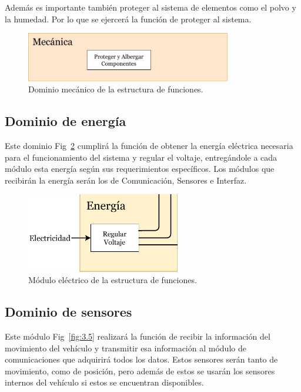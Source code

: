 Además es importante también proteger al sistema de elementos como el polvo y la humedad. Por lo que se ejercerá la función de proteger al sistema.

\begin{figure}[htbp!]
\centering
\includegraphics[width=0.8\textwidth]{mec.pdf}
\caption{Dominio mecánico de la estructura de funciones.}
\label{fig:3.3}
\end{figure}

\subsection{Dominio de energía}
Este dominio Fig~\ref{fig:3.4} cumplirá la función de obtener la energía eléctrica necesaria para el funcionamiento del sistema y regular el voltaje, entregándole a cada módulo esta energía según sus requerimientos específicos. Los módulos que recibirán la energía serán los de Comunicación, Sensores e Interfaz.

\begin{figure}[htbp!]
\centering
\includegraphics[width=0.6\textwidth]{elec.pdf}
\caption{Módulo eléctrico de la estructura de funciones.}
\label{fig:3.4}
\end{figure}


\subsection{Dominio de sensores}
Este módulo Fig~\ref{fig:3.5} realizará la función de recibir la información del movimiento del vehículo y transmitir esa información al módulo de comunicaciones que adquirirá todos los datos. Estos sensores serán tanto de movimiento, como de posición, pero además de estos se usarán los sensores internos del vehículo si estos se encuentran disponibles.

